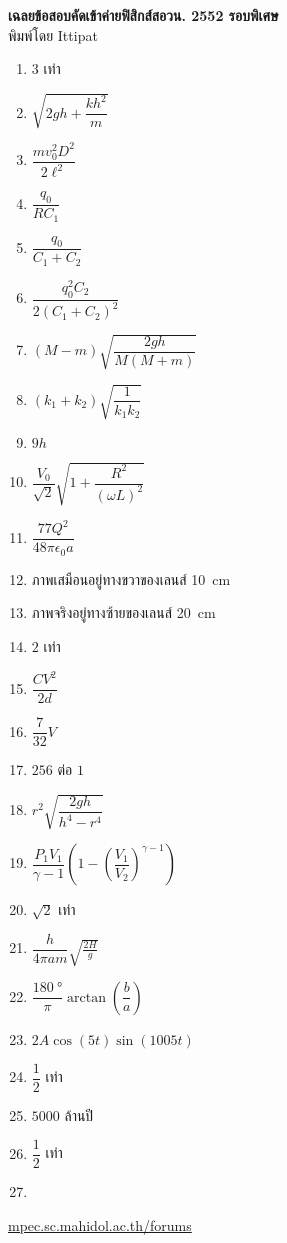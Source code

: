 \documentclass[a4paper,12pt]{article}
\begin{document}
\thispagestyle{empty}
\begin{center}
	{\huge \textbf{เฉลยข้อสอบคัดเข้าค่ายฟิสิกส์สอวน. 2552 รอบพิเศษ}}\\
	พิมพ์โดย Ittipat\\
\end{center}
\begin{enumerate}
	\item \(3\) เท่า
	\item \(\sqrt{2gh+\dfrac{kh^2}{m}}\)
	\item \(\dfrac{mv_0^2D^2}{2\ell^2}\)
	\item \(\dfrac{q_0}{RC_1}\)
	\item \(\dfrac{q_{0}}{C_{1}+C_{2}}\)
	\item \(\dfrac{q_{0}^{2}C_{2}}{2(C_{1}+C_{2})^2}\)
	\item \((M-m)\sqrt{\dfrac{2gh}{M(M+m)}}\)
	\item \((k_{1}+k_{2})\sqrt{\dfrac{1}{k_{1}k_{2}}}\) 
	\item \(9h\)
	\item \( \dfrac{V_{0}}{\sqrt{2}}\sqrt{1+\dfrac{R^{2}}{(\omega L)^{2}}}\)
	\item \(\dfrac{77Q^{2}}{48\pi \epsilon_{0}a}\)
	\item ภาพเสมือนอยู่ทางขวาของเลนส์ \SI{10}{cm}
	\item ภาพจริงอยู่ทางซ้ายของเลนส์ \SI{20}{cm}
	\item \(2\) เท่า
	\item \(\dfrac{CV^{2}}{2d}\)
	\item \(\dfrac{7}{32}V\)
	\item \(256\) ต่อ \(1\)
	\item \( r^{2}\sqrt{\dfrac{2gh}{h^{4}-r^{4}}}\)
	\item \(\dfrac{P_{1}V_{1}}{\gamma -1}\left( 1-\left( \dfrac{V_{1}}{V_{2}} \right)^{\gamma -1}  \right)\)
	\item \(\sqrt{2}\) เท่า
	\item \(\dfrac{h}{4\pi am}\sqrt{\frac{2H}{g}}\)
	\item \(\dfrac{\SI{180}{\degree}}{\pi}\arctan(\dfrac{b}{a})\)
	\item \(2A\cos(5t)\sin(1005t)\)
	\item \(\dfrac{1}{2}\) เท่า
	\item \(5000\) ล้านปี
	\item \(\dfrac{1}{2}\) เท่า
	\item
\end{enumerate}
\vfill	
\begin{center}
	\href{http://mpec.sc.mahidol.ac.th/forums/}{mpec.sc.mahidol.ac.th/forums}
\end{center}
\end{document}
